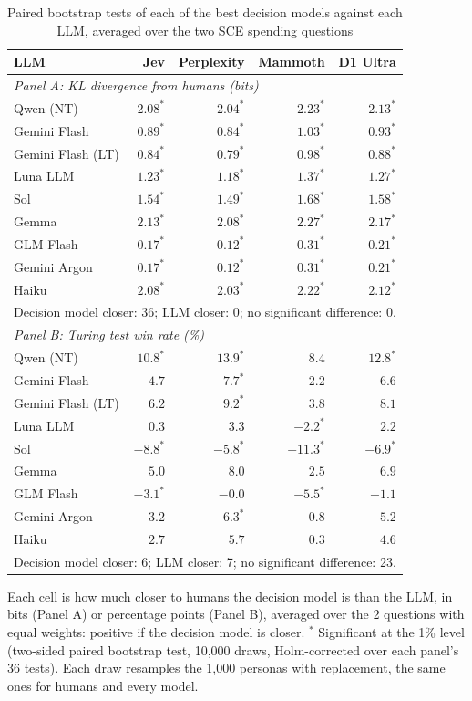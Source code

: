 \begin{table}[htbp]
\centering
\caption{Paired bootstrap tests of each of the best decision models against each LLM, averaged over the two SCE spending questions}
\label{tab:sce_bootstrap_best}
\begin{tabular}{lrrrr}
\toprule
LLM & Jev & Perplexity & Mammoth & D1 Ultra \\
\midrule
\multicolumn{5}{l}{\textit{Panel A: KL divergence from humans (bits)}} \\
\midrule
Qwen (NT) & $2.08^{*}$ & $2.04^{*}$ & $2.23^{*}$ & $2.13^{*}$ \\
Gemini Flash & $0.89^{*}$ & $0.84^{*}$ & $1.03^{*}$ & $0.93^{*}$ \\
Gemini Flash (LT) & $0.84^{*}$ & $0.79^{*}$ & $0.98^{*}$ & $0.88^{*}$ \\
Luna LLM & $1.23^{*}$ & $1.18^{*}$ & $1.37^{*}$ & $1.27^{*}$ \\
Sol & $1.54^{*}$ & $1.49^{*}$ & $1.68^{*}$ & $1.58^{*}$ \\
Gemma & $2.13^{*}$ & $2.08^{*}$ & $2.27^{*}$ & $2.17^{*}$ \\
GLM Flash & $0.17^{*}$ & $0.12^{*}$ & $0.31^{*}$ & $0.21^{*}$ \\
Gemini Argon & $0.17^{*}$ & $0.12^{*}$ & $0.31^{*}$ & $0.21^{*}$ \\
Haiku & $2.08^{*}$ & $2.03^{*}$ & $2.22^{*}$ & $2.12^{*}$ \\
\multicolumn{5}{l}{\footnotesize Decision model closer: 36; LLM closer: 0; no significant difference: 0.} \\
\midrule
\multicolumn{5}{l}{\textit{Panel B: Turing test win rate (\%)}} \\
\midrule
Qwen (NT) & $10.8^{*}$ & $13.9^{*}$ & $8.4$ & $12.8^{*}$ \\
Gemini Flash & $4.7$ & $7.7^{*}$ & $2.2$ & $6.6$ \\
Gemini Flash (LT) & $6.2$ & $9.2^{*}$ & $3.8$ & $8.1$ \\
Luna LLM & $0.3$ & $3.3$ & $-2.2^{*}$ & $2.2$ \\
Sol & $-8.8^{*}$ & $-5.8^{*}$ & $-11.3^{*}$ & $-6.9^{*}$ \\
Gemma & $5.0$ & $8.0$ & $2.5$ & $6.9$ \\
GLM Flash & $-3.1^{*}$ & $-0.0$ & $-5.5^{*}$ & $-1.1$ \\
Gemini Argon & $3.2$ & $6.3^{*}$ & $0.8$ & $5.2$ \\
Haiku & $2.7$ & $5.7$ & $0.3$ & $4.6$ \\
\multicolumn{5}{l}{\footnotesize Decision model closer: 6; LLM closer: 7; no significant difference: 23.} \\
\bottomrule
\end{tabular}
\par\smallskip
\parbox{\linewidth}{\footnotesize Each cell is how much closer to humans the decision model is than the LLM, in bits (Panel A) or percentage points (Panel B), averaged over the 2 questions with equal weights: positive if the decision model is closer. $^{*}$ Significant at the 1\% level (two-sided paired bootstrap test, 10,000 draws, Holm-corrected over each panel's 36 tests). Each draw resamples the 1,000 personas with replacement, the same ones for humans and every model.}
\end{table}
